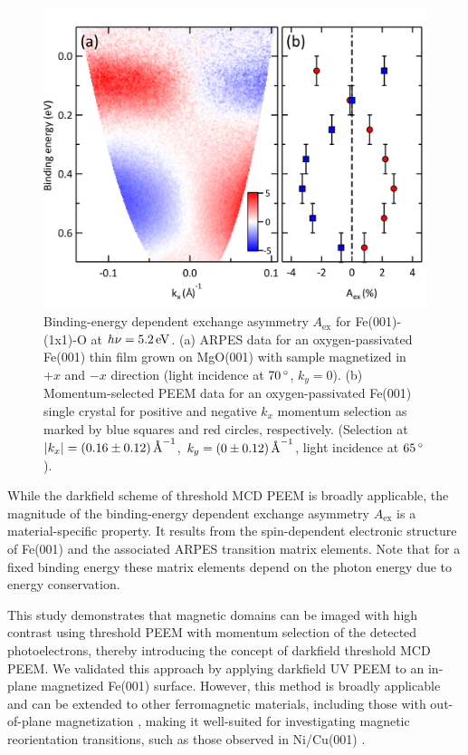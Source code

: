 \documentclass[prl,twocolumn,floatfix,superscriptaddress,aps]{revtex4-2}
\begin{document}
\begin{figure}
    \centering
    \includegraphics[width = 0.9\columnwidth]{FePaperFigARPES2.pdf}
    \caption{Binding-energy dependent exchange asymmetry $A_{\mathrm{ex}}$ for Fe(001)-(1x1)-O at $h\nu = \unit[5.2]{eV}$. (a) ARPES data for an oxygen-passivated Fe(001) thin film grown on MgO(001) with sample magnetized in $+x$ and $-x$ direction (light incidence at $\unit[70]{^{\circ}}$, $k_y = 0$). (b) Momentum-selected PEEM data for an oxygen-passivated Fe(001) single crystal for positive and negative $k_x$ momentum selection as marked by blue squares and red circles, respectively. (Selection at $|k_x| = \unit[(0.16 \pm 0.12)]{\text{\AA}^{-1}}$, $k_y = \unit[(0 \pm 0.12)]{\text{\AA}^{-1}}$, light incidence at $\unit[65]{^{\circ}}$).}
    \label{fig:AexContrast}
\end{figure}

While the darkfield scheme of threshold MCD PEEM is broadly applicable, the magnitude of the binding-energy dependent exchange asymmetry $A_{\mathrm{ex}}$ is a material-specific property. It results from the spin-dependent electronic structure of Fe(001) and the associated ARPES  transition matrix elements. Note that for a fixed binding energy these matrix elements depend on the photon energy due to energy conservation.

This study demonstrates that magnetic domains can be imaged with high contrast using threshold PEEM with momentum selection of the detected photoelectrons, thereby introducing the concept of darkfield threshold MCD PEEM\@. We validated this approach by applying darkfield UV PEEM to an in-plane magnetized Fe(001) surface. However, this method is broadly applicable and can be extended to other ferromagnetic materials, including those with out-of-plane magnetization \cite{kronseder2011}, making it well-suited for investigating magnetic reorientation transitions, such as those observed in Ni/Cu(001) \cite{henk1999,sander2004,nakagawa2006,kronseder2011}.
\end{document}
